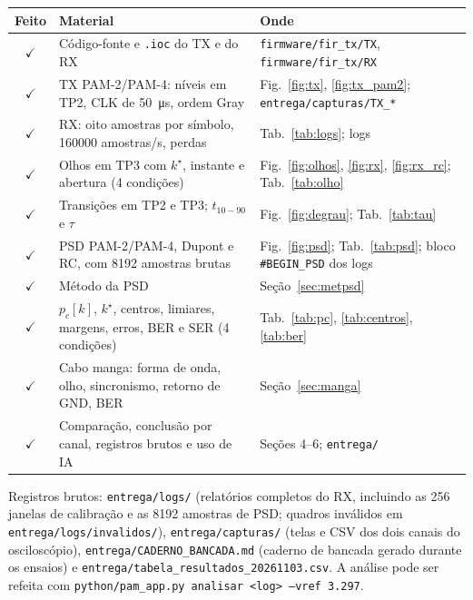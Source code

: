 \documentclass[12pt,a4paper]{article}
\begin{document}
\begin{table}[H]
\centering
\small
\begin{tabularx}{\textwidth}{c X l}
\toprule
Feito & Material & Onde \\
\midrule
$\checkmark$ & Código-fonte e \texttt{.ioc} do TX e do RX & \nolinkurl{firmware/fir_tx/TX}, \nolinkurl{firmware/fir_tx/RX} \\
$\checkmark$ & TX PAM-2/PAM-4: níveis em TP2, CLK de \SI{50}{\micro\second}, ordem Gray & Fig.~\ref{fig:tx}, \ref{fig:tx_pam2}; \nolinkurl{entrega/capturas/TX_*} \\
$\checkmark$ & RX: oito amostras por símbolo, \num{160000} amostras/s, perdas & Tab.~\ref{tab:logs}; logs \\
$\checkmark$ & Olhos em TP3 com $k^\star$, instante e abertura (4 condições) & Fig.~\ref{fig:olhos}, \ref{fig:rx}, \ref{fig:rx_rc}; Tab.~\ref{tab:olho} \\
$\checkmark$ & Transições em TP2 e TP3; $t_{10-90}$ e $\tau$ & Fig.~\ref{fig:degrau}; Tab.~\ref{tab:tau} \\
$\checkmark$ & PSD PAM-2/PAM-4, Dupont e RC, com \num{8192} amostras brutas & Fig.~\ref{fig:psd}; Tab.~\ref{tab:psd}; bloco \texttt{\#BEGIN\_PSD} dos logs \\
$\checkmark$ & Método da PSD & Seção~\ref{sec:metpsd} \\
$\checkmark$ & $p_c[k]$, $k^\star$, centros, limiares, margens, erros, BER e SER (4 condições) & Tab.~\ref{tab:pc}, \ref{tab:centros}, \ref{tab:ber} \\
$\checkmark$ & Cabo manga: forma de onda, olho, sincronismo, retorno de GND, BER & Seção~\ref{sec:manga} \\
$\checkmark$ & Comparação, conclusão por canal, registros brutos e uso de IA & Seções 4--6; \nolinkurl{entrega/} \\
\bottomrule
\end{tabularx}
\end{table}

Registros brutos: \nolinkurl{entrega/logs/} (relatórios completos do RX, incluindo as 256 janelas
de calibração e as \num{8192} amostras de PSD; quadros inválidos em \nolinkurl{entrega/logs/invalidos/}),
\nolinkurl{entrega/capturas/} (telas e CSV dos dois canais do osciloscópio),
\nolinkurl{entrega/CADERNO_BANCADA.md} (caderno de bancada gerado durante os ensaios) e
\nolinkurl{entrega/tabela_resultados_20261103.csv}. A análise pode ser refeita com
\texttt{python/pam\_app.py analisar <log> --vref 3.297}.
\end{document}

